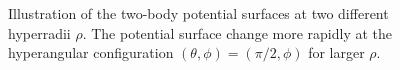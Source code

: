 \begin{figure}
	\centering  
	\caption{Illustration of the two-body potential surfaces at two different hyperradii $\rho$. The potential surface change more rapidly at the hyperangular configuration $(\theta,\phi)=(\pi/2,\phi)$ for larger $\rho$.}\label{fig:surfaces}
\end{figure}

